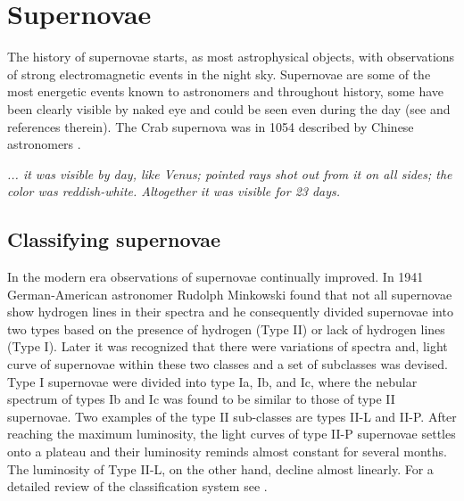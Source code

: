 

\chapter{Supernovae} \label{ch:ccsn}
The history of supernovae starts, as most astrophysical objects, with observations of strong
electromagnetic events in the night sky. Supernovae are some of the most energetic events known to astronomers and throughout history, some have been clearly visible by naked eye and could be seen even during the day (see \cite{hamacher_14} and references therein). 
The Crab supernova was in 1054 described by Chinese astronomers \citep{ho_96,shen_96}. 
\begin{displayquote}
\textit{... it was visible by day, like Venus; pointed rays shot out
from it on all sides; the color was reddish-white. Altogether it
was visible for 23 days.}
\end{displayquote}
\section{Classifying supernovae}
In the modern era observations of supernovae continually improved. In 1941
German-American astronomer Rudolph Minkowski \citep{minkowski_41} found
that not all supernovae show hydrogen lines in their spectra and
he consequently divided supernovae into two types based on the
presence of hydrogen (Type II) or lack of hydrogen lines (Type I).
Later it was recognized that there were variations of spectra and, light curve of supernovae within these two classes and a set of subclasses was devised. 
Type I supernovae were divided into type Ia, Ib, and Ic,
where the nebular spectrum of types Ib and Ic was found to be similar to
those of type II supernovae. Two examples of the type II sub-classes are
types II-L and II-P. After reaching the maximum luminosity, the light curves of type II-P supernovae settles onto a
plateau and their luminosity reminds almost constant for several months. The luminosity of Type II-L, on the other hand, 
decline almost linearly. For a detailed review of the classification system see \cite{cappellaro_01}.

